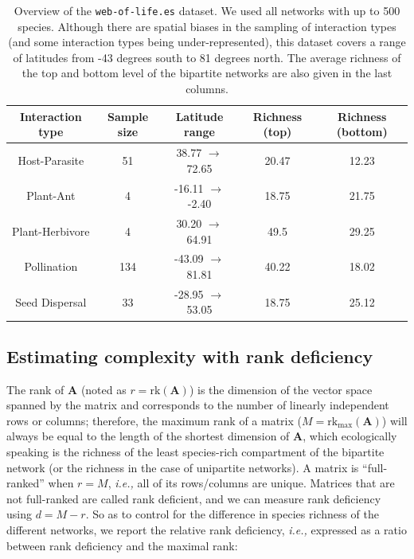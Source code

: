 \begin{refsection}
\begin{table}[h!]
\centering
\begin{tabular}{||c c c c c||} 
 \hline
 Interaction type & Sample size & Latitude range & Richness (top) & Richness
 (bottom) \\ [0.5ex] \hline\hline
 Host-Parasite & 51 & 38.77 \(\rightarrow\) 72.65 & 20.47 & 12.23 \\ 
 Plant-Ant & 4 & -16.11 \(\rightarrow\) -2.40 & 18.75 & 21.75 \\
 Plant-Herbivore & 4 & 30.20 \(\rightarrow\) 64.91 & 49.5 & 29.25 \\
 Pollination & 134 & -43.09 \(\rightarrow\) 81.81 & 40.22 & 18.02 \\
 Seed Dispersal & 33 & -28.95 \(\rightarrow\) 53.05 & 18.75 & 25.12 \\ [1ex] 
 \hline
\end{tabular}
\caption{Overview of the \texttt{web-of-life.es} dataset. We used all networks
with up to 500 species. Although there are spatial biases in the sampling of
interaction types (and some interaction types being under-represented), this
dataset covers a range of latitudes from -43 degrees south to 81 degrees north.
The average richness of the top and bottom level of the bipartite networks are
also given in the last columns.}
\label{table:summary}
\end{table}

\subsection{Estimating complexity with rank
deficiency}\label{estimating-complexity-with-rank-deficiency}

The rank of \(\mathbf{A}\) (noted as \(r = \text{rk}(\mathbf{A})\)) is the
dimension of the vector space spanned by the matrix and corresponds to the
number of linearly independent rows or columns; therefore, the maximum rank of a
matrix (\(M = \text{rk}_{\text{max}}(\mathbf{A})\)) will always be equal to the
length of the shortest dimension of \(\mathbf{A}\), which ecologically speaking
is the richness of the least species-rich compartment of the bipartite network
(or the richness in the case of unipartite networks). A matrix is
``full-ranked'' when \(r=M\), \emph{i.e.,} all of its rows/columns are unique.
Matrices that are not full-ranked are called rank deficient, and we can measure
rank deficiency using \(d = M-r\). So as to control for the difference in
species richness of the different networks, we report the relative rank
deficiency, \emph{i.e.,} expressed as a ratio between rank deficiency and the
maximal rank:


\end{refsection}
